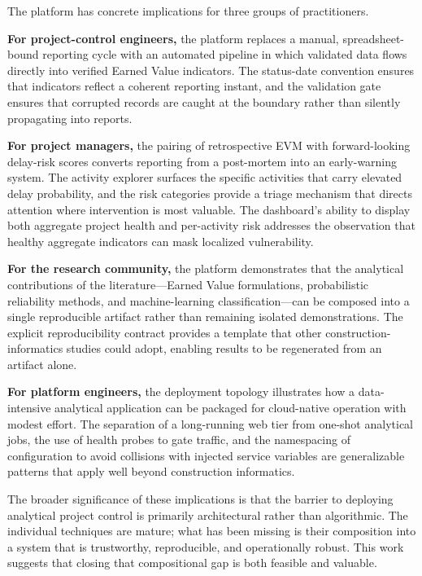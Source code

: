 \documentclass[conference]{IEEEtran}
\begin{document}
The platform has concrete implications for three groups of practitioners.

\textbf{For project-control engineers,} the platform replaces a manual, spreadsheet-bound reporting cycle with an automated pipeline in which validated data flows directly into verified Earned Value indicators. The status-date convention ensures that indicators reflect a coherent reporting instant, and the validation gate ensures that corrupted records are caught at the boundary rather than silently propagating into reports.

\textbf{For project managers,} the pairing of retrospective EVM with forward-looking delay-risk scores converts reporting from a post-mortem into an early-warning system. The activity explorer surfaces the specific activities that carry elevated delay probability, and the risk categories provide a triage mechanism that directs attention where intervention is most valuable. The dashboard's ability to display both aggregate project health and per-activity risk addresses the observation that healthy aggregate indicators can mask localized vulnerability.

\textbf{For the research community,} the platform demonstrates that the analytical contributions of the literature---Earned Value formulations, probabilistic reliability methods, and machine-learning classification---can be composed into a single reproducible artifact rather than remaining isolated demonstrations. The explicit reproducibility contract provides a template that other construction-informatics studies could adopt, enabling results to be regenerated from an artifact alone.

\textbf{For platform engineers,} the deployment topology illustrates how a data-intensive analytical application can be packaged for cloud-native operation with modest effort. The separation of a long-running web tier from one-shot analytical jobs, the use of health probes to gate traffic, and the namespacing of configuration to avoid collisions with injected service variables are generalizable patterns that apply well beyond construction informatics.

The broader significance of these implications is that the barrier to deploying analytical project control is primarily architectural rather than algorithmic. The individual techniques are mature; what has been missing is their composition into a system that is trustworthy, reproducible, and operationally robust. This work suggests that closing that compositional gap is both feasible and valuable.
\end{document}
